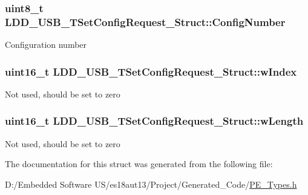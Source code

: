 \subsubsection[{Config\+Number}]{\setlength{\rightskip}{0pt plus 5cm}uint8\+\_\+t L\+D\+D\+\_\+\+U\+S\+B\+\_\+\+T\+Set\+Config\+Request\+\_\+\+Struct\+::\+Config\+Number}\label{struct_l_d_d___u_s_b___t_set_config_request___struct_a9a545d7858a7ee85dbe37eaf2b4b7e01}
Configuration number \hypertarget{struct_l_d_d___u_s_b___t_set_config_request___struct_ad2aa2851b128777e842b2ac796d2f664}{}
\subsubsection[{w\+Index}]{\setlength{\rightskip}{0pt plus 5cm}uint16\+\_\+t L\+D\+D\+\_\+\+U\+S\+B\+\_\+\+T\+Set\+Config\+Request\+\_\+\+Struct\+::w\+Index}\label{struct_l_d_d___u_s_b___t_set_config_request___struct_ad2aa2851b128777e842b2ac796d2f664}
Not used, should be set to zero \hypertarget{struct_l_d_d___u_s_b___t_set_config_request___struct_a66312977eb5816459d0201a2bacaf9b5}{}
\subsubsection[{w\+Length}]{\setlength{\rightskip}{0pt plus 5cm}uint16\+\_\+t L\+D\+D\+\_\+\+U\+S\+B\+\_\+\+T\+Set\+Config\+Request\+\_\+\+Struct\+::w\+Length}\label{struct_l_d_d___u_s_b___t_set_config_request___struct_a66312977eb5816459d0201a2bacaf9b5}
Not used, should be set to zero 

The documentation for this struct was generated from the following file\+:\begin{DoxyCompactItemize}
\item 
D\+:/\+Embedded Software U\+S/es18aut13/\+Project/\+Generated\+\_\+\+Code/\hyperlink{_p_e___types_8h}{P\+E\+\_\+\+Types.\+h}\end{DoxyCompactItemize}
